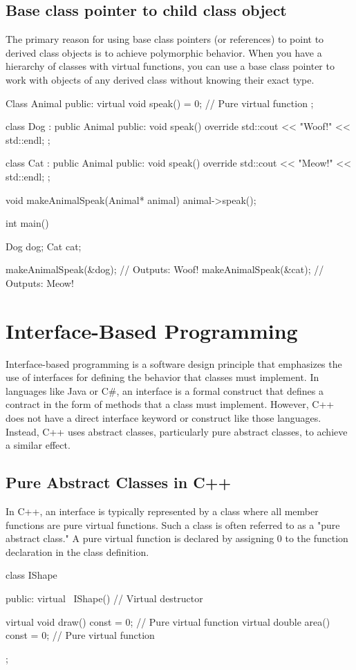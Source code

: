\documentclass{report}
\begin{document}
    \subsection{Base class pointer to child class object}
    \bigbreak \noindent 
    The primary reason for using base class pointers (or references) to point to derived class objects is to achieve polymorphic behavior. When you have a hierarchy of classes with virtual functions, you can use a base class pointer to work with objects of any derived class without knowing their exact type.
    \bigbreak \noindent 
    \begin{cppcode}
Class Animal {
public:
    virtual void speak() = 0; // Pure virtual function
};

class Dog : public Animal {
public:
    void speak() override { std::cout << "Woof!" << std::endl; }
};

class Cat : public Animal {
public:
    void speak() override { std::cout << "Meow!" << std::endl; }
};

void makeAnimalSpeak(Animal* animal) {
    animal->speak();
}

int main() {
    Dog dog;
    Cat cat;

    makeAnimalSpeak(&dog); // Outputs: Woof!
    makeAnimalSpeak(&cat); // Outputs: Meow!
}
    \end{cppcode}

    \pagebreak \bigbreak \noindent 
    \section{Interface-Based Programming}
    \bigbreak \noindent 
    \begin{concept}
        Interface-based programming is a software design principle that emphasizes the use of interfaces for defining the behavior that classes must implement. In languages like Java or C#, an interface is a formal construct that defines a contract in the form of methods that a class must implement. However, C++ does not have a direct interface keyword or construct like those languages. Instead, C++ uses abstract classes, particularly pure abstract classes, to achieve a similar effect. 
    \end{concept}

    \bigbreak \noindent 
    \subsection{Pure Abstract Classes in C++}
    \bigbreak \noindent 
    In C++, an interface is typically represented by a class where all member functions are pure virtual functions. Such a class is often referred to as a "pure abstract class." A pure virtual function is declared by assigning 0 to the function declaration in the class definition.
    \bigbreak \noindent 
    \begin{cppcode}
class IShape {
public:
    virtual ~IShape() {} // Virtual destructor

    virtual void draw() const = 0; // Pure virtual function
    virtual double area() const = 0; // Pure virtual function
};
    \end{cppcode}
\end{document}
